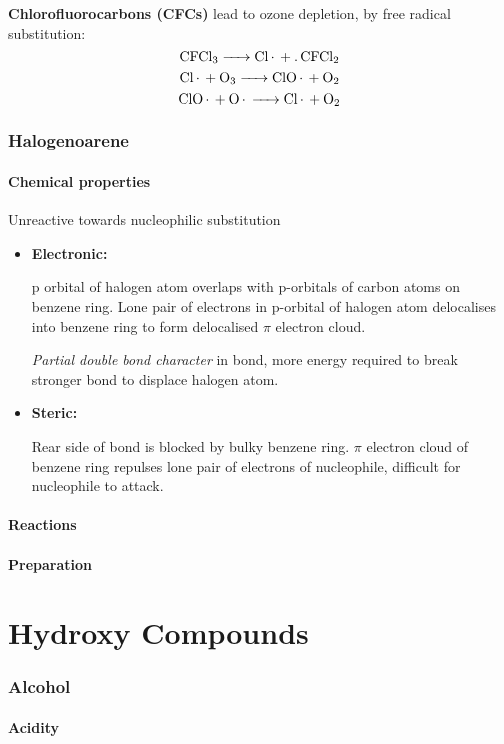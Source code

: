 \documentclass[12pt,a4 paper]{article}
\begin{document}
\textbf{Chlorofluorocarbons (CFCs)} lead to ozone depletion, by free radical substitution:
\[ \ce{CFCl3 -> Cl. + .CFCl2} \]
\[ \ce{Cl. + O3 -> ClO. + O2} \]
\[ \ce{ClO. + O. -> Cl. + O2} \]
\pagebreak

\section{Halogenoarene}
\subsection*{Chemical properties}
Unreactive towards nucleophilic substitution
\begin{itemize}
\item \textbf{Electronic:}

p orbital of halogen atom overlaps with p-orbitals of carbon atoms on benzene ring. Lone pair of electrons in p-orbital of halogen atom delocalises into benzene ring to form delocalised $\pi$ electron cloud.

\emph{Partial double bond character} in  bond, more energy required to break stronger  bond to displace halogen atom.

\item \textbf{Steric:}

Rear side of  bond is blocked by bulky benzene ring. $\pi$ electron cloud of benzene ring repulses lone pair of electrons of nucleophile, difficult for nucleophile to attack.
\end{itemize}

\subsection{Reactions}

\subsection{Preparation}
\pagebreak

\part{Hydroxy Compounds}
\section{Alcohol}
\subsection{Acidity}
\end{document}
